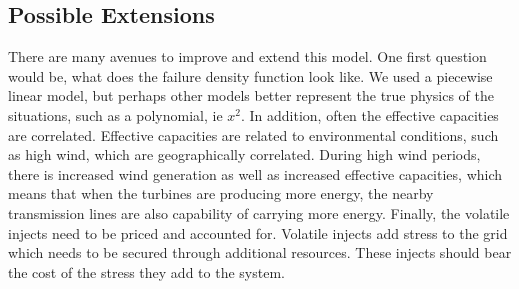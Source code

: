 \subsection{Possible Extensions}
There are many avenues to improve and extend this model.  One first question would be, what does the failure density function look like.  We used a piecewise linear model, but perhaps other models better represent the true physics of the situations, such as a polynomial, ie $x^2$.  In addition, often the effective capacities are correlated.  Effective capacities are related to environmental conditions, such as high wind, which are geographically correlated.  During high wind periods, there is increased wind generation as well as increased effective capacities, which means that when the turbines are producing more energy, the nearby transmission lines are also capability of carrying more energy.  Finally, the volatile injects need to be priced and accounted for.  Volatile injects add stress to the grid which needs to be secured through additional resources.  These injects should bear the cost of the stress they add to the system.


\theendnotes

\setcounter{endnote}{0}
